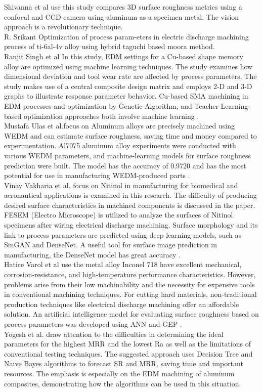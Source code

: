 \cite{shivanna2014evaluation}Shivanna et al use this study compares 3D surface roughness metrics using a confocal and CCD camera using aluminum as a specimen metal. The vision approach is a revolutionary technique.\\
\cite{srikanth2021optimization}R. Srikant Optimization of process param-eters in electric discharge machining process of ti-6al-4v alloy using hybrid taguchi based moora method.\\
\cite{singh2022machine}Ranjit Singh et al In this study, EDM settings for a Cu-based shape memory alloy are optimized using machine learning techniques. The study examines how dimensional deviation and tool wear rate are affected by process parameters. The study makes use of a central composite design matrix and employs 2-D and 3-D graphs to illustrate response parameter behavior. Cu-based SMA machining in EDM processes and optimization by Genetic Algorithm, and Teacher Learning-based optimization approaches both involve machine learning .\\
\cite{ulas2020surface} Mustafa Ulas et al.focus on Aluminum alloys are precisely machined using WEDM and can estimate surface roughness, saving time and money compared to experimentation. Al7075 aluminum alloy experiments were conducted with various WEDM parameters, and machine-learning models for surface roughness prediction were built. The model has the accuracy of 0.9720 and has the most potential for use in manufacturing WEDM-produced parts .\\
\cite{vakharia2022experimental}Vinay Vakharia et al. focus on Nitinol in manufacturing for biomedical and aeronautical applications is examined in this research. The difficulty of producing desired surface characteristics in machined components is discussed in the paper. FESEM (Electro Microscope) is utilized to analyze the surfaces of Nitinol specimens after wiring electrical discharge machining. Surface morphology and its link to process parameters are predicted using deep learning models, such as SinGAN and DenseNet. A useful tool for surface image prediction in manufacturing, the DenseNet model has great accuracy .\\
\cite{varol2021estimating}Hatice Varol et al use the metal alloy Inconel 718 have excellent mechanical, corrosion-resistance, and high-temperature performance characteristics. However, problems arise from their low machinability and the necessity for expensive tools in conventional machining techniques. For cutting hard materials, non-traditional production techniques like electrical discharge machining offer an affordable solution. An artificial intelligence model for evaluating surface roughness based on process parameters was developed using ANN and GEP .\\
\cite{yogesh2021predicton}Yogesh et al. draw attention to the difficulties in determining the ideal parameters for the highest MRR and the lowest Ra as well as the limitations of conventional testing techniques. The suggested approach uses Decision Tree and Naive Bayes algorithms to forecast SR and MRR, saving time and important resources. The emphasis is especially on the EDM machining of aluminum composites, demonstrating how the algorithms can be used in this situation. \\
